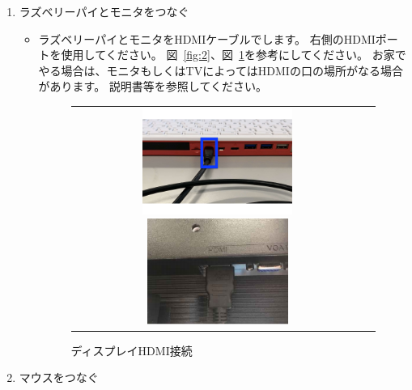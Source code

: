 \begin{enumerate}
  \item ラズベリーパイとモニタをつなぐ
    \begin{itemize}
      \item ラズベリーパイとモニタをHDMIケーブルでします。
      右側のHDMIポートを使用してください。
      図~\ref{fig:2}、図~\ref{fig:3}を参考にしてください。
      お家でやる場合は、モニタもしくはTVによってはHDMIの口の場所がなる場合があります。
      説明書等を参照してください。
      
      \begin{figure}[H]
        \begin{tabular}{cc}
          \begin{minipage}{0.45\textwidth}
            \centering
            \includegraphics[height=3.471cm]{text01-img/figure222023.pdf}
            \caption{ラズベリーパイHDMI接続}
            \label{fig:2}
          \end{minipage}
  
          \begin{minipage}{0.45\textwidth}
            \centering
            \includegraphics[height=3.471cm]{text01-img/textbook-img016.png}
            \caption{ディスプレイHDMI接続}
            \label{fig:3}
          \end{minipage}
        \end{tabular}
      \end{figure}
    \end{itemize}



  \item マウスをつなぐ


\end{enumerate}
